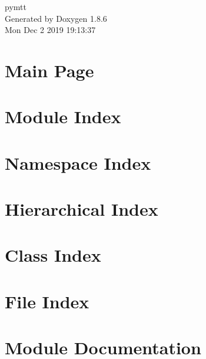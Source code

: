 \documentclass[twoside]{book}
\newcommand{\clearemptydoublepage}{%
  \newpage{\pagestyle{empty}\cleardoublepage}%
}
\begin{document}
\hypersetup{pageanchor=false}
\begin{titlepage}
\vspace*{7cm}
\begin{center}%
{\Large pymtt }\\
\vspace*{1cm}
{\large Generated by Doxygen 1.8.6}\\
\vspace*{0.5cm}
{\small Mon Dec 2 2019 19:13:37}\\
\end{center}
\end{titlepage}
\clearemptydoublepage
\tableofcontents
\clearemptydoublepage
{}
\hypersetup{pageanchor=true}

\chapter{Main Page}
\label{index}\hypertarget{index}{}
\chapter{Module Index}

\chapter{Namespace Index}

\chapter{Hierarchical Index}

\chapter{Class Index}

\chapter{File Index}

\chapter{Module Documentation}






















\end{document}
